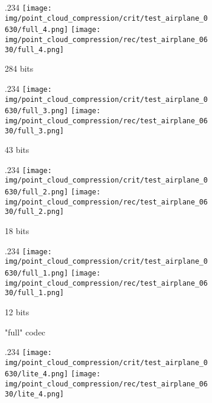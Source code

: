 \begin{figure}[t]
  \centering
  \newcommand{\subfigureouterhspace}{\linewidth}
  \newcommand{\subfigurehspace}{.234\linewidth}
  \begin{subfigure}[b]{\subfigureouterhspace}
    \setcounter{subsubfigure}{0}
    \centering
    \begin{subsubfigure}[b]{\subfigurehspace}
      \centering
      \texttt{[image: img/point\_cloud\_compression/crit/test\_airplane\_0630/full\_4.png]}
      \texttt{[image: img/point\_cloud\_compression/rec/test\_airplane\_0630/full\_4.png]}
      \caption{284 bits}
      \label{fig:rec/full/4}
    \end{subsubfigure}%
    \hfill%
    \begin{subsubfigure}[b]{\subfigurehspace}
      \centering
      \texttt{[image: img/point\_cloud\_compression/crit/test\_airplane\_0630/full\_3.png]}
      \texttt{[image: img/point\_cloud\_compression/rec/test\_airplane\_0630/full\_3.png]}
      \caption{43 bits}
      \label{fig:rec/full/3}
    \end{subsubfigure}%
    \hfill%
    \begin{subsubfigure}[b]{\subfigurehspace}
      \centering
      \texttt{[image: img/point\_cloud\_compression/crit/test\_airplane\_0630/full\_2.png]}
      \texttt{[image: img/point\_cloud\_compression/rec/test\_airplane\_0630/full\_2.png]}
      \caption{18 bits}
      \label{fig:rec/full/2}
    \end{subsubfigure}%
    \hfill%
    \begin{subsubfigure}[b]{\subfigurehspace}
      \centering
      \texttt{[image: img/point\_cloud\_compression/crit/test\_airplane\_0630/full\_1.png]}
      \texttt{[image: img/point\_cloud\_compression/rec/test\_airplane\_0630/full\_1.png]}
      \caption{12 bits}
      \label{fig:rec/full/1}
    \end{subsubfigure}%
    \caption{"full" codec}
  \end{subfigure}%
  \par%
  \vspace{1\baselineskip}%
  \begin{subfigure}[b]{\subfigureouterhspace}
    \setcounter{subsubfigure}{0}
    \centering
    \begin{subsubfigure}[b]{\subfigurehspace}
      \centering
      \texttt{[image: img/point\_cloud\_compression/crit/test\_airplane\_0630/lite\_4.png]}
      \texttt{[image: img/point\_cloud\_compression/rec/test\_airplane\_0630/lite\_4.png]}

\end{subsubfigure}
\end{subfigure}
\end{figure}
